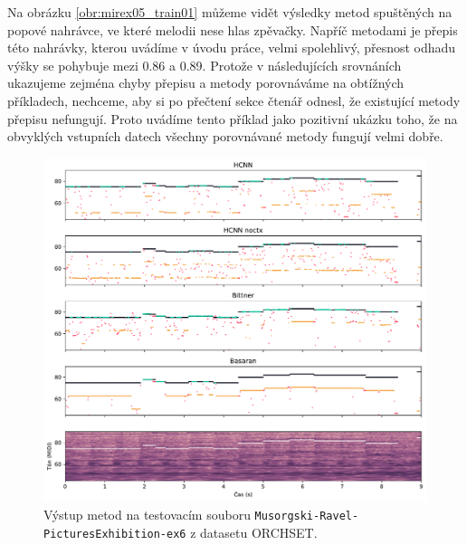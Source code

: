 Na obrázku \ref{obr:mirex05_train01} můžeme vidět výsledky metod spuštěných na popové nahrávce, ve které melodii nese hlas zpěvačky. Napříč metodami je přepis této nahrávky, kterou uvádíme v úvodu práce, velmi spolehlivý, přesnost odhadu výšky se pohybuje mezi 0.86 a 0.89. Protože v následujících srovnáních ukazujeme zejména chyby přepisu a metody porovnáváme na obtížných příkladech, nechceme, aby si po přečtení sekce čtenář odnesl, že existující metody přepisu nefungují. Proto uvádíme tento příklad jako pozitivní ukázku toho, že na obvyklých vstupních datech všechny porovnávané metody fungují velmi dobře.




\begin{figure}[h]\centering
\includegraphics[width=\textwidth,height=\textheight,keepaspectratio]{../img/vysledky/orchset_Musorgski-Ravel-PicturesExhibition-ex6}
\caption{Výstup metod na testovacím souboru \texttt{Musorgski-Ravel-PicturesExhibition-ex6} z datasetu ORCHSET.}
\label{obr:orchset_Musorgski-Ravel-PicturesExhibition-ex6}
\end{figure}

